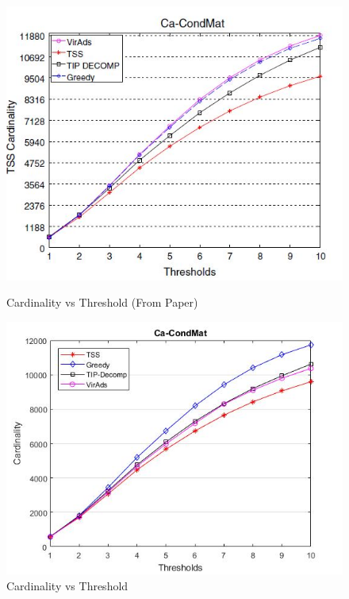 \begin{figure}[h!]
\begin{minipage}[t]{0.50\textwidth}
\includegraphics[width=\linewidth,keepaspectratio=true]{images/ca-condmatpaper.jpg}
\caption{Cardinality vs Threshold (From Paper)}

\end{minipage}
\begin{minipage}[t]{0.50\textwidth}
\includegraphics[width=\linewidth,keepaspectratio=true]{images/ca-condmatresult.jpg}
\caption{Cardinality vs Threshold}
\end{minipage}
\end{figure}

